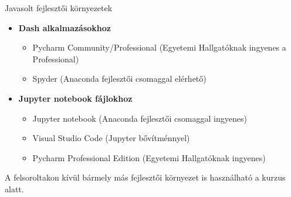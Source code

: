 \documentclass[english, aspectratio=169]{beamer}
\begin{document}
\begin{frame}{Javasolt fejlesztői környezetek}
	    \begin{itemize}
		\item \textbf{Dash alkalmazásokhoz}
		\begin{itemize}
			\item Pycharm Community/Professional (Egyetemi Hallgatóknak ingyenes a Professional)
			\item Spyder (Anaconda fejlesztői csomaggal elérhető)
		\end{itemize}
		\item \textbf{Jupyter notebook fájlokhoz}
		\begin{itemize}
			\item Jupyter notebook (Anaconda fejlesztői csomaggal ingyenes)
			\item Visual Studio Code (Jupyter bővítménnyel)
			\item Pycharm Professional Edition (Egyetemi Hallgatóknak ingyenes)
		\end{itemize}
	\end{itemize}
	\par\medskip
	A felsoroltakon kívül bármely más fejlesztői környezet is használható a kurzus alatt.
\end{frame}
\end{document}
